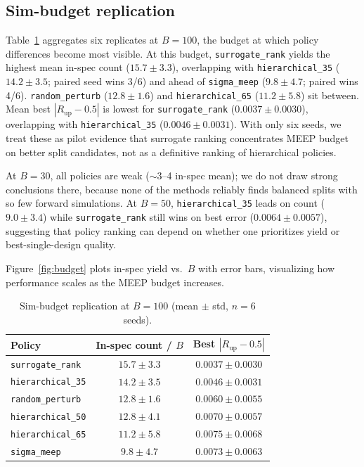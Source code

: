 \documentclass[11pt,a4paper]{article}
\begin{document}
\subsection{Sim-budget replication}

Table~\ref{tab:budget100} aggregates six replicates at $B=100$, the budget at which policy differences become most visible.
At this budget, \texttt{surrogate\_rank} yields the highest mean in-spec count ($15.7 \pm 3.3$), overlapping with \texttt{hierarchical\_35} ($14.2 \pm 3.5$; paired seed wins 3/6) and ahead of \texttt{sigma\_meep} ($9.8 \pm 4.7$; paired wins 4/6).
\texttt{random\_perturb} ($12.8 \pm 1.6$) and \texttt{hierarchical\_65} ($11.2 \pm 5.8$) sit between.
Mean best $|R_{\mathrm{up}}-0.5|$ is lowest for \texttt{surrogate\_rank} ($0.0037 \pm 0.0030$), overlapping with \texttt{hierarchical\_35} ($0.0046 \pm 0.0031$).
With only six seeds, we treat these as pilot evidence that surrogate ranking concentrates MEEP budget on better split candidates, not as a definitive ranking of hierarchical policies.

At $B=30$, all policies are weak ($\sim$3--4 in-spec mean); we do not draw strong conclusions there, because none of the methods reliably finds balanced splits with so few forward simulations.
At $B=50$, \texttt{hierarchical\_35} leads on count ($9.0 \pm 3.4$) while \texttt{surrogate\_rank} still wins on best error ($0.0064 \pm 0.0057$), suggesting that policy ranking can depend on whether one prioritizes yield or best-single-design quality.

Figure~\ref{fig:budget} plots in-spec yield vs.\ $B$ with error bars, visualizing how performance scales as the MEEP budget increases.

\begin{table}[t]
  \centering
  \caption{Sim-budget replication at $B=100$ (mean $\pm$ std, $n=6$ seeds).}
  \label{tab:budget100}
  \begin{tabular}{lcc}
    \toprule
    Policy & In-spec count / $B$ & Best $|R_{\mathrm{up}} - 0.5|$ \\
    \midrule
    \texttt{surrogate\_rank} & $\mathbf{15.7 \pm 3.3}$ & $\mathbf{0.0037 \pm 0.0030}$ \\
    \texttt{hierarchical\_35} & $14.2 \pm 3.5$ & $0.0046 \pm 0.0031$ \\
    \texttt{random\_perturb} & $12.8 \pm 1.6$ & $0.0060 \pm 0.0055$ \\
    \texttt{hierarchical\_50} & $12.8 \pm 4.1$ & $0.0070 \pm 0.0057$ \\
    \texttt{hierarchical\_65} & $11.2 \pm 5.8$ & $0.0075 \pm 0.0068$ \\
    \texttt{sigma\_meep} & $9.8 \pm 4.7$ & $0.0073 \pm 0.0063$ \\
    \bottomrule
  \end{tabular}
\end{table}
\end{document}
